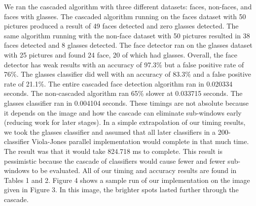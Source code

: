 \documentclass[12pt] {article}
\begin{document}
We ran the cascaded algorithm with three different datasets: faces, non-faces, and faces with glasses. The cascaded algorithm running on the faces dataset with 50 pictures produced a result of 49 faces detected and zero glasses detected. The same algorithm running with the non-face dataset with 50 pictures resulted in 38 faces detected and 8 glasses detected. The face detector ran on the glasses dataset with 25 pictures and found 24 face, 20 of which had glasses. Overall, the face detector has weak results with an accuracy of 97.3\% but a false positive rate of 76\%. The glasses classifier did well with an accuracy of 83.3\% and a false positive rate of 21.1\%. The entire cascaded face detection algorithm ran in 0.020334 seconds. The non-cascaded algorithm ran 65\% slower at 0.033715 seconds. The glasses classifier ran in 0.004104 seconds. These timings are not absolute because it depends on the image and how the cascade can eliminate sub-windows early (reducing work for later stages). In a simple extrapolation of our timing results, we took the glasses classifier and assumed that all later classifiers in a 200-classifier Viola-Jones parallel implementation would complete in that much time. The result was that it would take 824.718 ms to complete. This result is pessimistic because the cascade of classifiers would cause fewer and fewer sub-windows to be evaluated. All of our timing and accuracy results are found in Tables 1 and 2. Figure 4 shows a sample run of our implementation on the image given in Figure 3. In this image, the brighter spots lasted further through the cascade.
\end{document}
